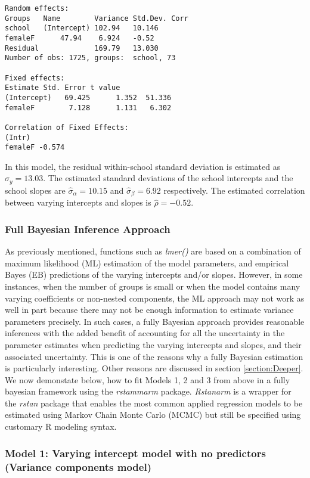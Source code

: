 \begin{Verbatim}[frame=single]
Random effects:
Groups   Name        Variance Std.Dev. Corr 
school   (Intercept) 102.94   10.146        
femaleF      47.94    6.924   -0.52
Residual             169.79   13.030        
Number of obs: 1725, groups:  school, 73

Fixed effects:
Estimate Std. Error t value
(Intercept)   69.425      1.352  51.336
femaleF        7.128      1.131   6.302

Correlation of Fixed Effects:
(Intr)
femaleF -0.574
\end{Verbatim}
In this model, the residual within-school standard deviation is estimated as $\hat{\sigma}_{y}=13.03$. The estimated standard deviations of the school intercepts and the school slopes are $\hat{\sigma}_{\alpha}= 10.15$ and $\hat{\sigma}_{\beta}=6.92$ respectively. The estimated correlation between varying intercepts and slopes is $\hat{\rho} = -0.52$. 

\subsubsection{Full Bayesian Inference Approach}
As previously mentioned, functions such as \textit{lmer()} are based on a combination of maximum likelihood (ML) estimation of the model parameters, and empirical Bayes (EB) predictions of the varying intercepts and/or slopes. However, in some instances, when the number of groups is small or when the model contains many varying coefficients or non-nested components, the ML approach may not work as well in part because there may not be enough information to estimate variance parameters precisely. In such cases, a fully Bayesian approach provides reasonable inferences with the added benefit of accounting for all the uncertainty in the parameter estimates when predicting the varying intercepts and slopes, and their associated uncertainty. This is one of the reasons why a fully Bayesian estimation is particularly interesting. Other reasons are discussed in section \ref{section:Deeper}. We now demonstate below, how to fit Models 1, 2 and 3 from above in a fully bayesian framework using the \textit{rstammarm} package. \textit{Rstanarm} is a wrapper for the \textit{rstan} package that enables the most common applied regression models to be estimated using Markov Chain Monte Carlo (MCMC) but still be specified using customary R modeling syntax.

\subsubsection*{Model 1: Varying intercept model with no predictors (Variance components model)}

